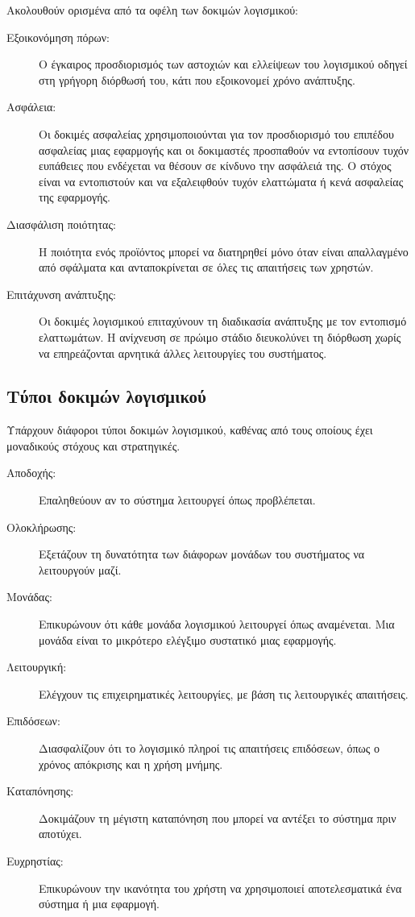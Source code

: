 Ακολουθούν ορισμένα από τα οφέλη των δοκιμών λογισμικού:
\begin{description}
	\item[Εξοικονόμηση πόρων:] Ο έγκαιρος προσδιορισμός των αστοχιών και ελλείψεων του λογισμικού οδηγεί στη γρήγορη διόρθωσή του, κάτι που εξοικονομεί χρόνο ανάπτυξης.
	\item[Ασφάλεια:] Οι δοκιμές ασφαλείας χρησιμοποιούνται για τον προσδιορισμό του επιπέδου ασφαλείας μιας εφαρμογής και οι δοκιμαστές προσπαθούν να εντοπίσουν τυχόν ευπάθειες που ενδέχεται να θέσουν σε κίνδυνο την ασφάλειά της. Ο στόχος είναι να εντοπιστούν και να εξαλειφθούν τυχόν ελαττώματα ή κενά ασφαλείας της εφαρμογής.
	\item[Διασφάλιση ποιότητας:] Η ποιότητα ενός προϊόντος μπορεί να διατηρηθεί μόνο όταν είναι απαλλαγμένο από σφάλματα και ανταποκρίνεται σε όλες τις απαιτήσεις των χρηστών.
	\item[Επιτάχυνση ανάπτυξης:] Οι δοκιμές λογισμικού επιταχύνουν τη διαδικασία ανάπτυξης με τον εντοπισμό ελαττωμάτων. Η ανίχνευση σε πρώιμο στάδιο διευκολύνει τη διόρθωση χωρίς να επηρεάζονται αρνητικά άλλες λειτουργίες του συστήματος.
\end{description}

\subsection{Τύποι δοκιμών λογισμικού}

Υπάρχουν διάφοροι τύποι δοκιμών λογισμικού, καθένας από τους οποίους έχει μοναδικούς στόχους και στρατηγικές.

\begin{description}
	\item[Αποδοχής:] Επαληθεύουν αν το σύστημα λειτουργεί όπως προβλέπεται.
	\item[Ολοκλήρωσης:] Εξετάζουν τη δυνατότητα των διάφορων μονάδων του συστήματος να λειτουργούν μαζί.
	\item[Μονάδας:] Επικυρώνουν ότι κάθε μονάδα λογισμικού λειτουργεί όπως αναμένεται. Μια μονάδα είναι το μικρότερο ελέγξιμο συστατικό μιας εφαρμογής.
	\item[Λειτουργική:] Ελέγχουν τις επιχειρηματικές λειτουργίες, με βάση τις λειτουργικές απαιτήσεις.
	\item[Επιδόσεων:] Διασφαλίζουν ότι το λογισμικό πληροί τις απαιτήσεις επιδόσεων, όπως ο χρόνος απόκρισης και η χρήση μνήμης.
	\item[Καταπόνησης:] Δοκιμάζουν τη μέγιστη καταπόνηση που μπορεί να αντέξει το σύστημα πριν αποτύχει.
	\item[Ευχρηστίας:] Επικυρώνουν την ικανότητα του χρήστη να χρησιμοποιεί αποτελεσματικά ένα σύστημα ή μια εφαρμογή.
\end{description}

